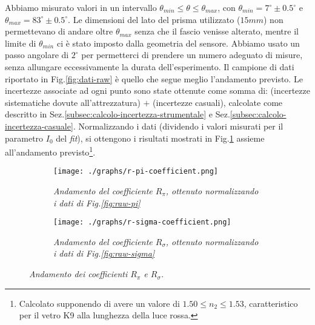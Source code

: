   Abbiamo misurato valori in un intervallo ${\theta_{min} \leq \theta \leq \theta_{max}}$,
  con ${\theta_{min} = 7^\circ \pm 0.5^\circ}$ e $\theta_{max} = 83^\circ \pm 0.5^\circ$.
  Le dimensioni del lato del prisma utilizzato ($15mm$) non permettevano
  di andare oltre $\theta_{max}$ senza che il fascio venisse alterato, mentre il
  limite di $\theta_{min}$ ci è stato imposto dalla geometria del sensore.
  Abbiamo usato un passo angolare di $2^\circ$ per permetterci di prendere un
  numero adeguato di misure, senza allungare eccessivamente la durata dell'esperimento.
  Il campione di dati riportato in Fig.\ref{fig:dati-raw} è quello che segue meglio
  l'andamento previsto.
  Le incertezze associate ad ogni punto sono state ottenute come somma di:
  (incertezze sistematiche dovute all'attrezzatura) $+$ (incertezze casuali), calcolate come
  descritto in Sez.\ref{subsec:calcolo-incertezza-strumentale} e Sez.\ref{subsec:calcolo-incertezza-casuale}.
  Normalizzando i dati (dividendo i valori misurati per il parametro $I_0$ del \emph{fit}), si ottengono i risultati mostrati in Fig.\ref{fig:normalised-coefficients}
  assieme all'andamento previsto\footnote{Calcolato supponendo di avere un valore di $1.50 \leq n_2 \leq 1.53$,
  caratteristico per il vetro K9 alla lunghezza della luce rossa.}. %
  \begin{figure}[H]
    \centering
    \begin{subfigure}[t]{.47\textwidth}
      \texttt{[image: ./graphs/r-pi-coefficient.png]}
      \caption{
        \emph{
          Andamento del coefficiente $R_\pi$, ottenuto normalizzando i dati
          di Fig.\ref{fig:raw-pi}
        }
      }
      \label{fig:normalised-coefficients}
    \end{subfigure}
    \hspace{5mm}
    \begin{subfigure}[t]{.47\textwidth}
      \texttt{[image: ./graphs/r-sigma-coefficient.png]}
      \caption{
        \emph{
          Andamento del coefficiente $R_\sigma$, ottenuto normalizzando i dati
          di Fig.\ref{fig:raw-sigma}
        }
      }
      \label{fig:coefficienti-ampiezza}
    \end{subfigure}
    \caption{\emph{Andamento dei coefficienti $R_\pi$ e $R_\sigma$.}}
  \end{figure}
%
